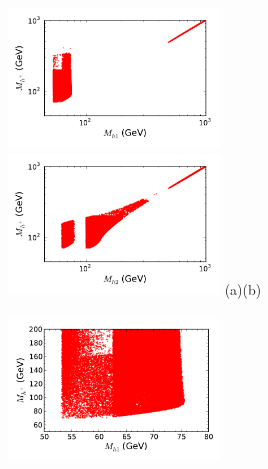 \documentclass[12pt,a4paper]{article}
\begin{document}
\begin{figure}[htb]
\hspace*{-0.2cm}\includegraphics[width=0.50\textwidth]{Mh1_Mhc_Omega_zoom-cut123456789_zz-large-monoc.pdf}%
\hspace*{-0.2cm}\includegraphics[width=0.50\textwidth]{Mhc_Mh2_Omega_zoom-cut123456789_zz-large-monoc.pdf}
\vskip -1.0cm
\hspace*{1cm}(a)\hspace*{0.55\textwidth}\hspace*{-1.5cm}(b)
\\
\\
\hspace*{-0.2cm}\includegraphics[width=0.50\textwidth]{Mh1_Mhc_Omega_zoom-cut123456789_zz-monoc.pdf}%

\end{figure}
\end{document}
